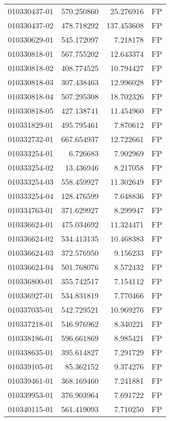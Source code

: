 \begin{tabular}{lrrl}
010330437-01 &  570.250860 &    25.276916 &   FP \\
010330437-02 &  478.718292 &   137.453608 &   FP \\
010330629-01 &  545.172097 &     7.218178 &   FP \\
010330818-01 &  567.755202 &    12.643374 &   FP \\
010330818-02 &  408.774525 &    10.794427 &   FP \\
010330818-03 &  307.438463 &    12.996028 &   FP \\
010330818-04 &  507.295308 &    18.702326 &   FP \\
010330818-05 &  427.138741 &    11.454960 &   FP \\
010331829-01 &  495.795461 &     7.870612 &   FP \\
010332732-01 &  667.654937 &    12.722661 &   FP \\
010333254-01 &    6.726683 &     7.902969 &   FP \\
010333254-02 &   13.436946 &     8.217058 &   FP \\
010333254-03 &  558.459927 &    11.302649 &   FP \\
010333254-04 &  128.476599 &     7.648836 &   FP \\
010334763-01 &  371.629927 &     8.299947 &   FP \\
010336624-01 &  475.034692 &    11.324471 &   FP \\
010336624-02 &  534.413135 &    10.468383 &   FP \\
010336624-03 &  372.576950 &     9.156233 &   FP \\
010336624-04 &  501.768076 &     8.572432 &   FP \\
010336800-01 &  355.742517 &     7.154112 &   FP \\
010336927-01 &  534.831819 &     7.770466 &   FP \\
010337035-01 &  542.729521 &    10.969276 &   FP \\
010337218-01 &  546.976962 &     8.340221 &   FP \\
010338186-01 &  596.661869 &     8.985421 &   FP \\
010338635-01 &  395.614827 &     7.291729 &   FP \\
010339105-01 &   85.362152 &     9.374276 &   FP \\
010339461-01 &  368.169460 &     7.241881 &   FP \\
010339953-01 &  376.903964 &     7.691722 &   FP \\
010340115-01 &  561.419093 &     7.710250 &   FP \\

\end{tabular}
